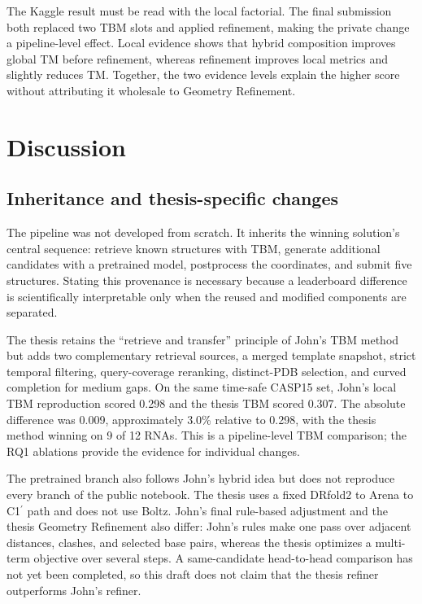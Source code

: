\documentclass[12pt,a4paper,oneside]{report}
\newcommand{\cprime}{C1$^{\prime}$}
\begin{document}
The Kaggle result must be read with the local factorial. The final submission both
replaced two TBM slots and applied refinement, making the private change a pipeline-level
effect. Local evidence shows that hybrid composition improves global TM before
refinement, whereas refinement improves local metrics and slightly reduces TM. Together,
the two evidence levels explain the higher score without attributing it wholesale to
Geometry Refinement.

\chapter{Discussion}
\label{chap:discussion_en}

\section{Inheritance and thesis-specific changes}

The pipeline was not developed from scratch. It inherits the winning solution's central
sequence: retrieve known structures with TBM, generate additional candidates with a
pretrained model, postprocess the coordinates, and submit five structures. Stating this
provenance is necessary because a leaderboard difference is scientifically interpretable
only when the reused and modified components are separated.

The thesis retains the ``retrieve and transfer'' principle of John's TBM method but adds
two complementary retrieval sources, a merged template snapshot, strict temporal
filtering, query-coverage reranking, distinct-PDB selection, and curved completion for
medium gaps. On the same time-safe CASP15 set, John's local TBM reproduction scored 0.298
and the thesis TBM scored 0.307. The absolute difference was 0.009, approximately 3.0\%
relative to 0.298, with the thesis method winning on 9 of 12 RNAs. This is a pipeline-level
TBM comparison; the RQ1 ablations provide the evidence for individual changes.

The pretrained branch also follows John's hybrid idea but does not reproduce every branch
of the public notebook. The thesis uses a fixed DRfold2 to Arena to \cprime{} path and
does not use Boltz. John's final rule-based adjustment and the thesis Geometry Refinement
also differ: John's rules make one pass over adjacent distances, clashes, and selected
base pairs, whereas the thesis optimizes a multi-term objective over several steps. A
same-candidate head-to-head comparison has not yet been completed, so this draft does not
claim that the thesis refiner outperforms John's refiner.
\end{document}
